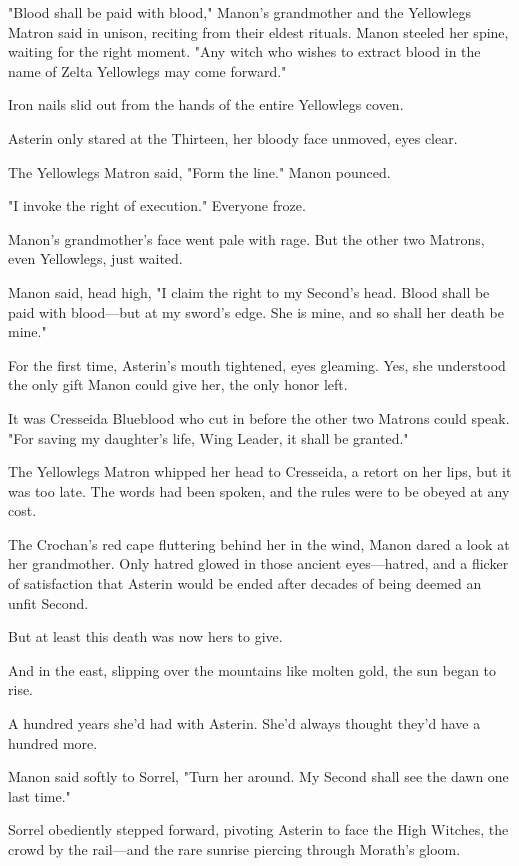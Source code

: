 "Blood shall be paid with blood," Manon's grandmother and the Yellowlegs Matron said in unison, reciting from their eldest rituals. Manon steeled her spine, waiting for the right moment. "Any witch who wishes to extract blood in the name of Zelta Yellowlegs may come forward."

Iron nails slid out from the hands of the entire Yellowlegs coven.

Asterin only stared at the Thirteen, her bloody face unmoved, eyes clear.

The Yellowlegs Matron said, "Form the line." Manon pounced.

"I invoke the right of execution." Everyone froze.

Manon's grandmother's face went pale with rage. But the other two Matrons, even Yellowlegs, just waited.

Manon said, head high, "I claim the right to my Second's head. Blood shall be paid with blood---but at my sword's edge. She is mine, and so shall her death be mine."

For the first time, Asterin's mouth tightened, eyes gleaming. Yes, she understood the only gift Manon could give her, the only honor left.

It was Cresseida Blueblood who cut in before the other two Matrons could speak. "For saving my daughter's life, Wing Leader, it shall be granted."

The Yellowlegs Matron whipped her head to Cresseida, a retort on her lips, but it was too late. The words had been spoken, and the rules were to be obeyed at any cost.

The Crochan's red cape fluttering behind her in the wind, Manon dared a look at her grandmother. Only hatred glowed in those ancient eyes---hatred, and a flicker of satisfaction that Asterin would be ended after decades of being deemed an unfit Second.

But at least this death was now hers to give.

And in the east, slipping over the mountains like molten gold, the sun began to rise.

A hundred years she'd had with Asterin. She'd always thought they'd have a hundred more.

Manon said softly to Sorrel, "Turn her around. My Second shall see the dawn one last time."

Sorrel obediently stepped forward, pivoting Asterin to face the High Witches, the crowd by the rail---and the rare sunrise piercing through Morath's gloom.

